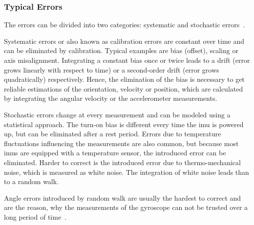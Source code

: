 \subsubsection{Typical  Errors}
\label{sse:mems_errors}
The errors can be divided into two categories: systematic and stochastic errors~\cite{Zhang2019}.\par
Systematic errors or also known as calibration errors are constant over time and can be eliminated by calibration.
Typical examples are bias (offset), scaling or axis misalignment.
Integrating a constant bias once or twice leads to a drift (error grows linearly with respect to time) or a second-order drift (error grows quadratically) respectively.
Hence, the elimination of the bias is necessary to get reliable estimations of the orientation, velocity or position, which are calculated by integrating the angular velocity or the accelerometer measurements.\par
Stochastic errors change at every measurement and can be modeled using a statistical approach.
The turn-on bias is different every time the \gls{imu} is powered up, but can be eliminated after a rest period.
Errors due to temperature fluctuations influencing the measurements are also common, but because most \glspl{imu} are equipped with a temperature sensor, the introduced error can be eliminated.
Harder to correct is the introduced error due to thermo-mechanical noise, which is measured as white noise.
The integration of white noise leads than to a random walk.\par
Angle errors introduced by random walk are usually the hardest to correct and are the reason, why the measurements of the gyroscope can not be trusted over a long period of time~\cite{Woodman2007}.


